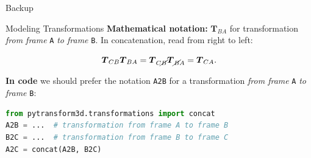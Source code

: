 \documentclass[14pt,aspectratio=169]{beamer}
\begin{document}
\begin{frame}
\begin{center}
\Large
Backup
\end{center}
\end{frame}


\begin{frame}{Modeling Transformations}
\textbf{Mathematical notation:}
$\boldsymbol{T}_{BA}$ for transformation \textit{from frame} \texttt{A} \textit{to frame}
\texttt{B}. In concatenation, read from right to left:

\[
\boldsymbol{T}_{CB} \boldsymbol{T}_{BA} = \boldsymbol{T}_{C\cancel{B}} \boldsymbol{T}_{\cancel{B}A} = \boldsymbol{T}_{CA}.
\]

\vfill

\textbf{In code} we should prefer the notation \texttt{A2B}
for a transformation \textit{from frame} \texttt{A} \textit{to frame} \texttt{B}:

\begin{lstlisting}[language=Python]
from pytransform3d.transformations import concat
A2B = ...  # transformation from frame A to frame B
B2C = ...  # transformation from frame B to frame C
A2C = concat(A2B, B2C)
\end{lstlisting}
\end{frame}
\end{document}
